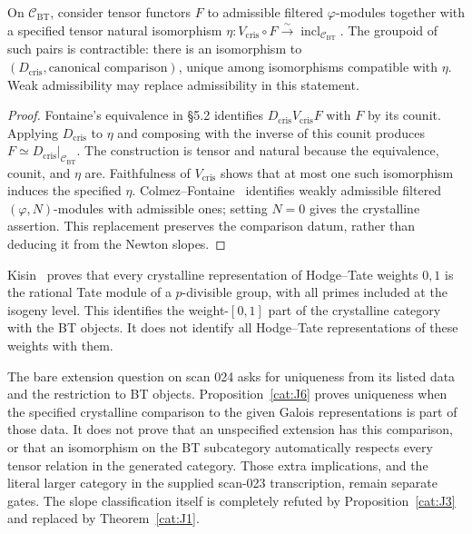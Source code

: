 \begin{proposition}\label{cat:J6}
On $\mathcal C_{\mathrm{BT}}$, consider tensor functors $F$ to
admissible filtered $\varphi$-modules together with a specified tensor
natural isomorphism
$\eta:V_{\mathrm{cris}}\circ F\xrightarrow{\sim}
\operatorname{incl}_{\mathcal C_{\mathrm{BT}}}$.
The groupoid of such pairs is contractible: there is an isomorphism
to $(D_{\mathrm{cris}},\text{canonical comparison})$, unique among
isomorphisms compatible with $\eta$.  Weak admissibility may replace
admissibility in this statement.
\end{proposition}
\begin{proof}
Fontaine's equivalence in \S5.2 identifies
$D_{\mathrm{cris}}V_{\mathrm{cris}}F$ with $F$ by its counit.
Applying $D_{\mathrm{cris}}$ to $\eta$ and composing with the inverse
of this counit produces $F\simeq D_{\mathrm{cris}}|_{\mathcal C_{\mathrm{BT}}}$.
The construction is tensor and natural because the equivalence, counit,
and $\eta$ are.  Faithfulness of $V_{\mathrm{cris}}$ shows that at most
one such isomorphism induces the specified $\eta$.
Colmez--Fontaine~\cite[Theorem A; \S4.1, Theorem 4.3 and its
corollary]{catColmezFontaine2000} identifies weakly admissible
filtered $(\varphi,N)$-modules with admissible ones; setting $N=0$
gives the crystalline assertion.  This replacement preserves the
comparison datum, rather than deducing it from the Newton slopes.
\end{proof}

Kisin~\cite[Theorem (0.3), Corollary (2.2.6)]{catKisin2006} proves
that every crystalline representation of Hodge--Tate weights $0,1$
is the rational Tate module of a $p$-divisible group, with all primes
included at the isogeny level.  This identifies the weight-$[0,1]$
part of the crystalline category with the BT objects.  It does not
identify all Hodge--Tate representations of these weights with them.

The bare extension question on scan 024 asks for uniqueness from its
listed data and the restriction to BT objects.  Proposition~\ref{cat:J6}
proves uniqueness when the specified crystalline comparison to the given
Galois representations is part of those data.  It does not prove that
an unspecified extension has this comparison, or that an isomorphism
on the BT subcategory automatically respects every tensor relation in
the generated category.  Those extra implications, and the literal
larger category in the supplied scan-023 transcription, remain separate
gates.  The slope classification itself is completely refuted by
Proposition~\ref{cat:J3} and replaced by Theorem~\ref{cat:J1}.
